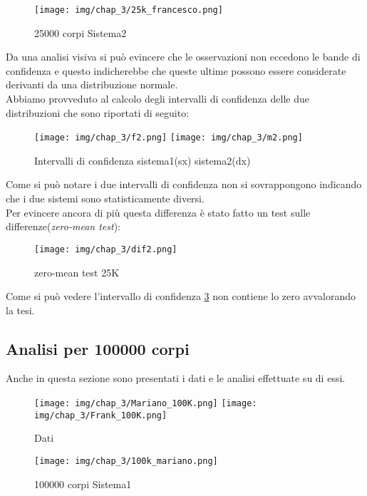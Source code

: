 \begin{figure}[H]
    \centering
    \texttt{[image: img/chap\_3/25k\_francesco.png]}
    \caption{25000 corpi Sistema2}
    \label{fig:sis_2_25_k}
\end{figure}
\noindent
Da una analisi visiva si può evincere che le osservazioni non eccedono le bande di confidenza e questo indicherebbe che queste ultime possono essere considerate derivanti da una distribuzione normale.\\
Abbiamo provveduto al calcolo degli intervalli di confidenza delle due distribuzioni che sono riportati di seguito:\\
\begin{figure}[H]
    \centering
    \texttt{[image: img/chap\_3/f2.png]}
    \texttt{[image: img/chap\_3/m2.png]}
    \caption{Intervalli di confidenza sistema1(sx) sistema2(dx)}
    \label{fig:sis_2_25_k}
\end{figure}
\noindent
Come si può notare i due intervalli di confidenza non si sovrappongono indicando che i due sistemi sono statisticamente diversi.\\
Per evincere ancora di più questa differenza è stato fatto un test sulle differenze(\textit{zero-mean test}):
\begin{figure}[H]
    \centering
    \texttt{[image: img/chap\_3/dif2.png]}
    \caption{zero-mean test 25K}
    \label{fig:zero-mean}
\end{figure}
\noindent
Come si può vedere l'intervallo di confidenza \ref{fig:zero-mean} non contiene lo zero avvalorando la tesi.
\newpage
\subsection{Analisi per 100000 corpi}
Anche in questa sezione sono presentati i dati e le analisi effettuate su di essi.
\begin{figure}[H]
    \centering
    \texttt{[image: img/chap\_3/Mariano\_100K.png]}
    \texttt{[image: img/chap\_3/Frank\_100K.png]}
    \caption{Dati}
    \label{fig:data_2}
\end{figure}
\begin{figure}[H]
    \centering
    \texttt{[image: img/chap\_3/100k\_mariano.png]}
    \caption{100000 corpi Sistema1}
    \label{fig:sis_1_100_k}
\end{figure}


